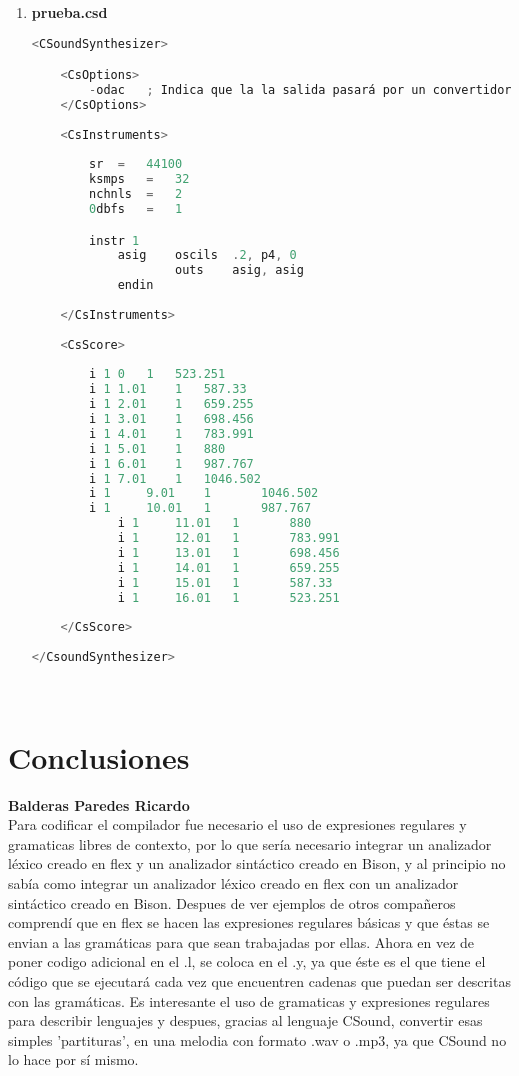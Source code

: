 \documentclass[12pt]{article}
\begin{document}
\begin{enumerate}
\begin{lstlisting}[language=C]
	return 0;
\end{lstlisting}\\

\item {\bf prueba.csd}\\
\begin{lstlisting}[language=C]
<CSoundSynthesizer>

	<CsOptions>
		-odac	; Indica que la la salida pasará por un convertidor Digital-Analógoco (DAC) y será reproducida
	</CsOptions>
	
	<CsInstruments>
	
		sr	=	44100
		ksmps	=	32
		nchnls	=	2
		0dbfs	=	1

		instr 1
			asig    oscils	.2, p4, 0
        			outs    asig, asig
	        endin
	
	</CsInstruments>
	
	<CsScore>
	
		i 1	0	1	523.251
		i 1	1.01	1	587.33
		i 1	2.01	1	659.255
		i 1	3.01	1	698.456
		i 1	4.01	1	783.991
		i 1	5.01	1	880
		i 1	6.01	1	987.767
		i 1	7.01	1	1046.502
		i 1     9.01    1       1046.502
		i 1     10.01   1       987.767
        	i 1     11.01   1       880
	        i 1     12.01   1       783.991
        	i 1     13.01   1       698.456
	        i 1     14.01   1       659.255
        	i 1     15.01   1       587.33
	        i 1     16.01   1       523.251
	
	</CsScore>
	
</CsoundSynthesizer>
\end{lstlisting}\\

\end{enumerate}


\section{Conclusiones}

{\bf Balderas Paredes Ricardo}\\
Para codificar el compilador fue necesario el uso de expresiones regulares y gramaticas libres de contexto, por lo que sería necesario integrar un analizador léxico creado en flex y un analizador sintáctico creado en Bison, y al principio no sabía como integrar un analizador léxico creado en flex con un analizador sintáctico creado en Bison. Despues de ver ejemplos de otros compañeros comprendí que en flex se hacen las expresiones regulares básicas y que éstas se envian a las gramáticas para que sean trabajadas por ellas. Ahora en vez de poner codigo adicional en el .l, se coloca en el .y, ya que éste es el que tiene el código que se ejecutará cada vez que encuentren cadenas que puedan ser descritas con las gramáticas. Es interesante el uso de gramaticas y expresiones regulares para describir lenguajes y despues, gracias al lenguaje CSound, convertir esas simples 'partituras', en una melodia con formato .wav o .mp3, ya que CSound no lo hace por sí mismo.
\end{document}
